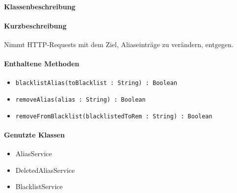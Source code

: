 \paragraph*{Klassenbeschreibung}%
\paragraph*{Kurzbeschreibung}
Nimmt HTTP-Requests mit dem Ziel, Aliaseinträge zu verändern, entgegen.
\paragraph*{Enthaltene Methoden}
\begin{itemize}
    \item \texttt{blacklistAlias(toBlacklist : String) : Boolean}
    \item \texttt{removeAlias(alias : String) : Boolean}
    \item \texttt{removeFromBlacklist(blacklistedToRem : String) : Boolean}
\end{itemize}
\paragraph*{Genutzte Klassen}
\begin{itemize}
    \item AliasService
    \item DeletedAliasService
    \item BlacklistService
\end{itemize}